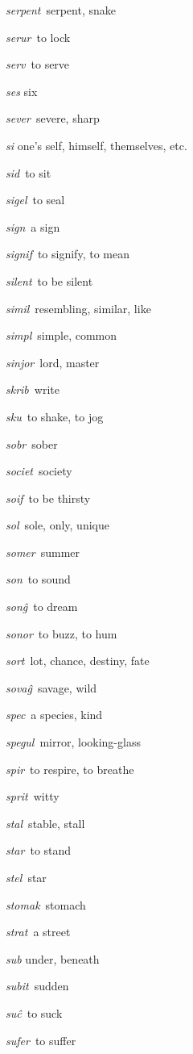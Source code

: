 \begin{landscape}
\begin{multicols}{5}
\begin{outdent}{1em}
\emph{serpent\,} serpent, snake

\emph{serur\,} to lock

\emph{serv\,} to serve

\emph{ses} six

\emph{sever\,} severe, sharp

\emph{si} one’s self, himself, themselves, etc.

\emph{sid\,} to sit

\emph{sigel\,} to seal

\emph{sign\,} a sign

\emph{signif\,} to signify, to mean

\emph{silent\,} to be silent

\emph{simil\,} resembling, similar, like

\emph{simpl\,} simple, common

\emph{sinjor\,} lord, master

\emph{skrib\,} write

\emph{sku\,} to shake, to jog

\emph{sobr\,} sober

\emph{societ\,} society

\emph{soif\,} to be thirsty

\emph{sol\,} sole, only, unique

\emph{somer\,} summer

\emph{son\,} to sound

\emph{sonĝ\,} to dream

\emph{sonor\,} to buzz, to hum

\emph{sort\,} lot, chance, destiny, fate

\emph{sovaĝ\,} savage, wild

\emph{spec\,} a species, kind

\emph{spegul\,} mirror, looking-glass

\emph{spir\,} to respire, to breathe

\emph{sprit\,} witty

\emph{stal\,} stable, stall

\emph{star\,} to stand

\emph{stel\,} star

\emph{stomak\,} stomach

\emph{strat\,} a street

\emph{sub} under, beneath

\emph{subit\,} sudden

\emph{suĉ\,} to suck

\emph{sufer\,} to suffer


\end{outdent}
\end{multicols}
\end{landscape}
